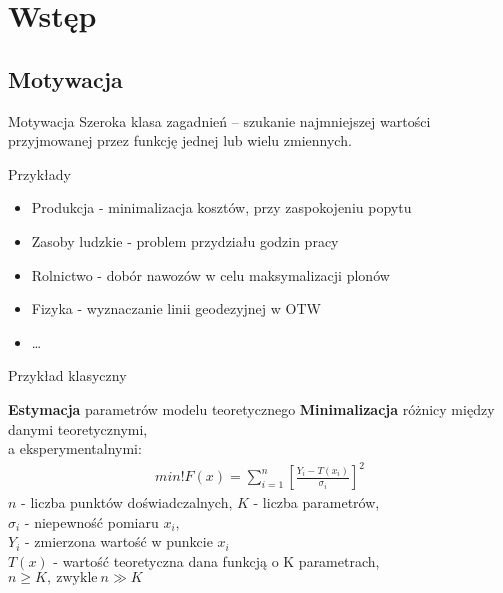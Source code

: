 \section{Wstęp}

\subsection{Motywacja}

  \begin{frame}{Motywacja}
    Szeroka klasa zagadnień -- szukanie najmniejszej wartości
    przyjmowanej przez funkcję jednej lub wielu zmiennych.

    \begin{exampleblock}{Przykłady}
      \begin{itemize}
        \item Produkcja - minimalizacja kosztów, przy zaspokojeniu popytu
        \item Zasoby ludzkie - problem przydziału godzin pracy
        \item Rolnictwo - dobór nawozów w celu maksymalizacji plonów
        \item Fizyka - wyznaczanie linii geodezyjnej w OTW
        \item \ldots
      \end{itemize}
    \end{exampleblock}
  \end{frame}

  \begin{frame}{Przykład klasyczny}
    \begin{exampleblock}{\textbf{Estymacja} parametrów modelu teoretycznego}
      \textbf{Minimalizacja} różnicy między danymi teoretycznymi,\\
        a eksperymentalnymi:
        \begin{gather*}
          min!F(x) = \sum_{i = 1}^{n} \left[ \frac{Y_i - T(x_i)}{\sigma_i}
          \right] ^2
        \end{gather*}
        $ n $ - liczba punktów doświadczalnych,
        $ K $ - liczba parametrów,\\
        $ \sigma_i $ - niepewność pomiaru $ x_i $,\\
        $ Y_i $ - zmierzona wartość w punkcie $ x_i $ \\
        $ T(x) $ - wartość teoretyczna dana funkcją o K parametrach,\\
        $ n \geq K{,}\ \text{zwykle}\ n \gg K $
    \end{exampleblock}
  \end{frame}

